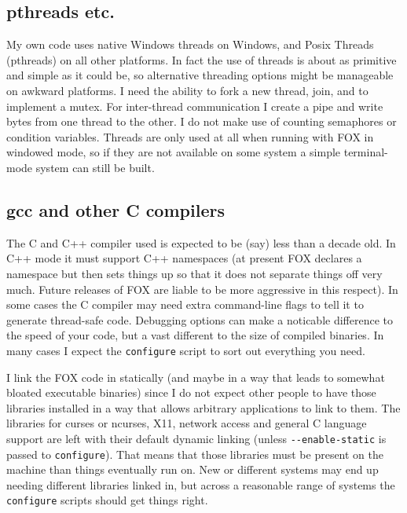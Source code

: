 \documentclass[11pt]{article}
\begin{document}
\subsection{pthreads etc.}
My own code uses native Windows threads on Windows, and Posix Threads
(pthreads) on all other platforms. In fact the use of threads is about
as primitive and simple as it could be, so alternative threading options
might be manageable on awkward platforms. I need the ability to fork
a new thread, join, and to implement a mutex. For inter-thread
communication I create a pipe and write bytes from one thread to
the other. I do not make use of counting semaphores or condition variables.
Threads are only used at all when running with FOX in windowed mode, so if
they are not available on some system a simple terminal-mode system can
still be built. 

\subsection{gcc and other C compilers}
The C and C++ compiler used is expected to be (say) less than a decade
old. In C++ mode it must support C++ namespaces (at present FOX declares
a namespace but then sets things up so that it does not separate things off
very much. Future releases of FOX are liable to be more aggressive in this
respect). In some cases the C compiler may need extra command-line flags
to tell it to generate thread-safe code. Debugging options can make a
noticable difference to the speed of your code, but a vast different to the
size of compiled binaries. In many cases I expect the \verb+configure+ script
to sort out everything you need.

I link the FOX code in statically (and maybe in a way that leads
to somewhat bloated executable binaries) since I do not expect other
people to have those libraries installed in a way that allows arbitrary
applications to link to them. The libraries for curses or ncurses, X11,
network access and general C language support are left with their default
dynamic linking (unless \verb+--enable-static+ is passed to \verb+configure+).
That means that those libraries must be present on the machine than things
eventually run on. New or different systems may end up needing different
libraries linked in, but across a reasonable range of systems the
\verb+configure+ scripts should get things right.
\end{document}
